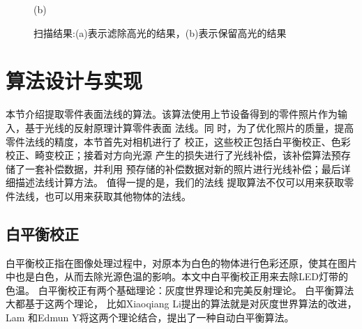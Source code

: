 \begin{figure}[htbp]
\begin{minipage}[]{1.0\linewidth}
	\centerline{
		\footnotesize{(b)}
	}
	\label{caputureb}
	\end{minipage}
\caption{扫描结果:(a)表示滤除高光的结果，(b)表示保留高光的结果}
\label{caputure}
\vspace{-5pt}
\end{figure}

\section{算法设计与实现}

本节介绍提取零件表面法线的算法。该算法使用上节设备得到的零件照片作为输入，基于光线的反射原理计算零件表面
法线。同
时，为了优化照片的质量，提高零件法线的精度，本节首先对相机进行了
校正，这些校正包括白平衡校正、色彩校正、畸变校正；接着对方向光源
产生的损失进行了光线补偿，该补偿算法预存储了一套补偿数据，并利用
预存储的补偿数据对新的照片进行光线补偿；最后详细描述法线计算方法。
值得一提的是，我们的法线
提取算法不仅可以用来获取零件法线，也可以用来获取其他物体的法线。

\subsection{白平衡校正}

白平衡校正指在图像处理过程中，对原本为白色的物体进行色彩还原，使其在图片中也是白色，从而去除光源色温的影响。本文中白平衡校正用来去除LED灯带的色温。
白平衡校正有两个基础理论：灰度世界理论和完美反射理论。
白平衡算法大都基于这两个理论，
比如Xiaoqiang Li\cite{10.1007/978-3-642-37149-3_38}提出的算法就是对灰度世界算法的改进，
Lam 和Edmun Y\cite{lam2005combining}将这两个理论结合，提出了一种自动白平衡算法。


